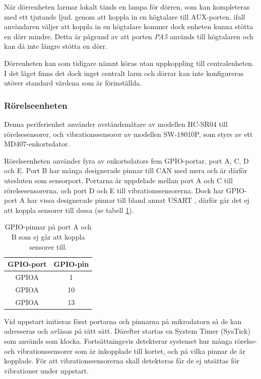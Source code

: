 \documentclass{article}
\begin{document}
När dörrenheten larmar lokalt tänds en lampa för dörren, som kan kompleteras med ett tjutande ljud.
genom att koppla in en högtalare till AUX-porten. ifall användaren väljer att koppla in en högtalare
kommer dock enheten kunna stötta en dörr mindre. Detta är pågrund av att porten \textit{PA5} används
till högtalaren och kan då inte längre stötta en dörr.

Dörrenheten kan som tidigare nämnt köras utan uppkoppling till centralenheten. I det läget finns det dock inget centralt larm
och dörrar kan inte konfigureras utöver standard värdena som är förinställda.




\subsubsection{Rörelseenheten}
Denna periferienhet använder avståndsmätare av modellen HC-SR04\cite{HC-SR04} till rörelsesensorer,
 och vibrationssensorer av modellen SW-18010P\cite{SW-18010P}, som styrs av ett MD407-enkortsdator.

Rörelseenheten använder fyra av enkortsdators fem GPIO-portar, port A, C, D och E. 
Port B har många designerade pinnar till CAN med mera och är därför utesluten som 
sensorport. Portarna är uppdelade mellan port A och C till rörelsesensorerna,
och port D och E till vibrationssensorerna. Dock har GPIO-port A har vissa designerade pinnar 
till bland annat USART , därför går det ej att koppla sensorer till dessa (se tabell \ref{tab:Ogiltliga pinnar}).

\begin{table}[htbp]
	\centering
	\begin{tabular}{|c|c|} \hline
		GPIO-port & GPIO-pin \\ \hline \hline
		GPIOA & 1 \\ \hline
		GPIOA & 10 \\ \hline
		GPIOA & 13 \\ \hline
	\end{tabular}
	\caption{GPIO-pinnar på port A och B som ej går att koppla sensorer till.}
	\label{tab:Ogiltliga pinnar}
\end{table}

Vid uppstart initieras först portarna och pinnarna på mikrodatorn så de kan adresseras och avläsas på rätt sätt. Därefter startas en System Timer (SysTick) som används som klocka.
Fortsättningsvis detekterar systemet hur många rörelse- och vibrationssensorer som är inkopplade till kortet, och på vilka pinnar de är kopplade. För att vibrationssensorerna skall detekteras får de ej utsättas för vibrationer under uppstart.
\end{document}
